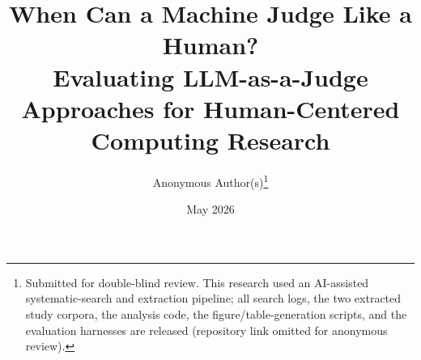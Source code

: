 \documentclass[11pt]{article}
\title{\textbf{When Can a Machine Judge Like a Human?}\\[3pt]
\large Evaluating LLM-as-a-Judge Approaches for Human-Centered Computing Research}
\author{Anonymous Author(s)\thanks{Submitted for double-blind review. This research used an AI-assisted
systematic-search and extraction pipeline; all search logs, the two extracted study corpora, the analysis code, the
figure/table-generation scripts, and the evaluation harnesses are released (repository link omitted for anonymous
review).}}
\date{May 2026}
\begin{document}
\maketitle

\begin{abstract}

\end{abstract}

\tableofcontents
\bigskip







\end{document}
